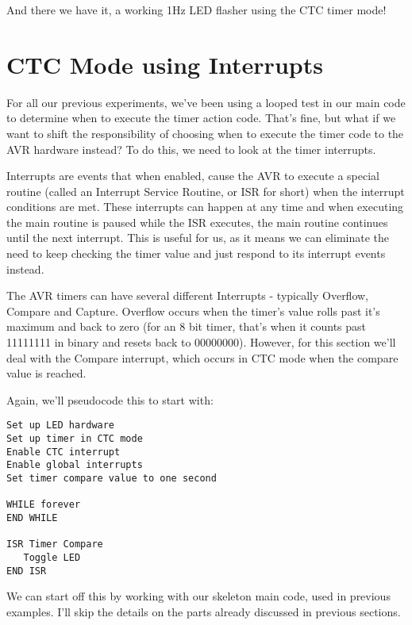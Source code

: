 \documentclass[a4paper,oneside,notitlepage]{book}
\begin{document}
And there we have it, a working 1Hz LED flasher using the CTC timer mode! 


\label{chp:CTCInt}
\chapter{CTC Mode using Interrupts}

For all our previous experiments, we've been using a looped test in our main code to determine when to execute the timer action code. That's fine, but what if we want to shift the responsibility of choosing when to execute the timer code to the AVR hardware instead? To do this, we need to look at the timer interrupts.

Interrupts are events that when enabled, cause the AVR to execute a special routine (called an Interrupt Service Routine, or ISR for short) when the interrupt conditions are met. These interrupts can happen at any time and when executing the main routine is paused while the ISR executes, the main routine continues until the next interrupt. This is useful for us, as it means we can eliminate the need to keep checking the timer value and just respond to its interrupt events instead.

The AVR timers can have several different Interrupts - typically Overflow, Compare and Capture. Overflow occurs when the timer's value rolls past it's maximum and back to zero (for an 8 bit timer, that's when it counts past 11111111 in binary and resets back to 00000000). However, for this section we'll deal with the Compare interrupt, which occurs in CTC mode when the compare value is reached.

Again, we'll pseudocode this to start with: 

\begin{center}
\begin{lstlisting}[keywordstyle=\color{black},commentstyle=\color{black}]
Set up LED hardware
Set up timer in CTC mode
Enable CTC interrupt
Enable global interrupts
Set timer compare value to one second

WHILE forever
END WHILE

ISR Timer Compare
   Toggle LED
END ISR 
\end{lstlisting}
\end{center}

We can start off this by working with our skeleton main code, used in previous examples. I'll skip the details on the parts already discussed in previous sections.
\end{document}
